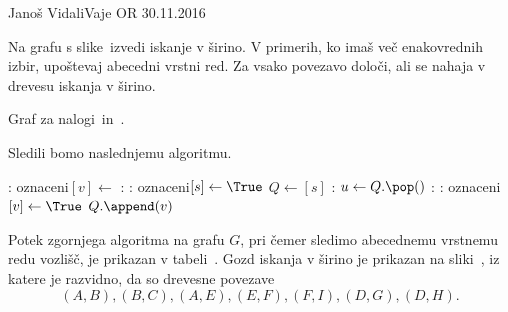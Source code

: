 
\begin{naloga}{Janoš Vidali}{Vaje OR 30.11.2016}
\begin{vprasanje}
Na grafu s slike~\fig izvedi iskanje v širino.
V primerih, ko imaš več ena\-ko\-vred\-nih izbir,
upoštevaj abecedni vrstni red.
Za vsako povezavo določi, ali se nahaja v drevesu iskanja v širino.

\begin{slika}
\pgfslika
\caption{Graf za nalogi~\nal in~\nal[dfs].}
\end{slika}
\end{vprasanje}

\begin{odgovor}
Sledili bomo naslednjemu algoritmu.
\begin{small}
\begin{algorithmic}
	:
		\State oznaceni$[v] \gets$ \False
	\EndFor
	:
		:
			\State oznaceni$[s] \gets \True$
			\State $Q \gets [s]$
			:
				\State $u \gets Q.\pop()$
				:
					:
						\State oznaceni$[v] \gets \True$
						\State $Q.\append(v)$
					\EndIf
				\EndFor
			\EndWhile
		\EndIf
	\EndFor
\end{algorithmic}
\end{small}
%
Potek zgornjega algoritma na grafu $G$,
pri čemer sledimo abecednemu vrstnemu redu vozlišč,
je prikazan v tabeli~\tab.
Gozd iskanja v širino je prikazan na sliki~,
iz katere je razvidno, da so drevesne povezave
$$
(A, B), (B, C), (A, E), (E, F), (F, I), (D, G), (D, H).
$$


\end{odgovor}
\end{naloga}

